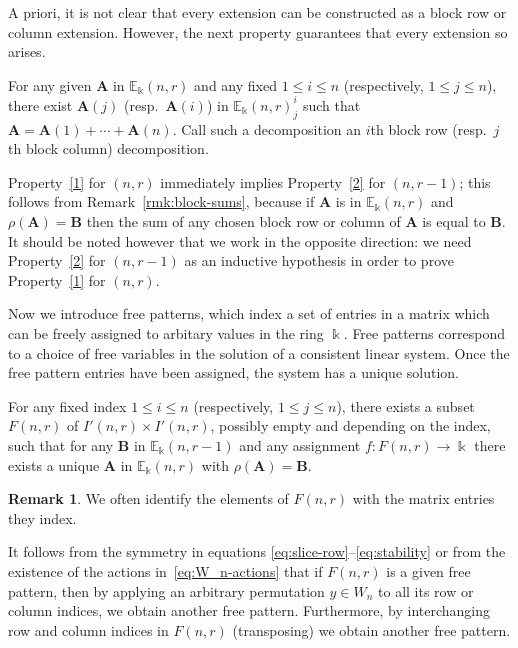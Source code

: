 \documentclass[10pt]{article}
\theoremstyle{definition}
\newtheorem{rema}[theorem]{Remark}
\providecommand{\resp}{resp.\ }
\newcommand{\E}{\mathbb{E}}
\newcommand{\bA}{\mathbf{A}}
\newcommand{\bB}{\mathbf{B}}
\begin{document}
A priori, it is not clear that every extension can be constructed as a
block row or column extension. However, the next property guarantees
that every extension so arises.

\begin{property}\label{2}
 For any given $\bA$ in $\E_\Bbbk(n,r)$ and any fixed $1\le i \le n$
 \textup{(}respectively, $1 \le j \le n$\textup{)}, there exist
 $\bA(j)$ \textup{(}\resp $\bA(i)$\textup{)} in $\E_\Bbbk(n,r)^i_j$
 such that $\bA = \bA(1) + \cdots + \bA(n)$. Call such a
 decomposition an $i$th block row \textup{(}\resp $j$th block
 column\textup{)} decomposition.
\end{property}

Property~\ref{1} for $(n,r)$ immediately implies Property~\ref{2} for
$(n,r-1)$; this follows from Remark~\ref{rmk:block-sums}, because if
$\bA$ is in $\E_\Bbbk(n,r)$ and $\rho(\bA)=\bB$ then the sum of any
chosen block row or column of $\bA$ is equal to $\bB$. It should be
noted however that we work in the opposite direction: we need
Property~\ref{2} for $(n,r-1)$ as an inductive hypothesis in order to
prove Property~\ref{1} for $(n,r)$.

Now we introduce free patterns, which index a set of entries in a
matrix which can be freely assigned to arbitary values in the ring
$\Bbbk$. Free patterns correspond to a choice of free variables in
the solution of a consistent linear system. Once the free pattern
entries have been assigned, the system has a unique solution. 


\begin{property}\label{3}
 For any fixed index $1\le i \le n$ \textup{(}respectively, $1 \le j
 \le n$\textup{)}, there exists a subset $F(n,r)$ of $I'(n,r) \times
 I'(n,r)$, possibly empty and depending on the index, such that for
 any $\bB$ in $\E_\Bbbk(n,r-1)$ and any assignment $f: F(n,r) \to
 \Bbbk$ there exists a unique $\bA$ in $\E_\Bbbk(n,r)$ with
 $\rho(\bA) = \bB$.
\end{property}


\begin{rema}
We often identify the elements of $F(n,r)$ with the matrix entries
they index. 
\end{rema}


It follows from the symmetry in equations
\eqref{eq:slice-row}--\eqref{eq:stability} or from the existence of
the actions in~\eqref{eq:W_n-actions} that if $F(n,r)$ is a given free
pattern, then by applying an arbitrary permutation $y\in W_n$ to all
its row or column indices, we obtain another free
pattern. Furthermore, by interchanging row and column indices in
$F(n,r)$ (transposing) we obtain another free pattern.
\end{document}
